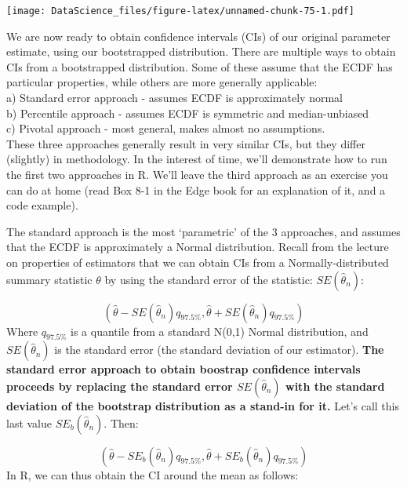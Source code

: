 \documentclass[
]{book}
\begin{document}
\texttt{[image: DataScience\_files/figure-latex/unnamed-chunk-75-1.pdf]}

We are now ready to obtain confidence intervals (CIs) of our original parameter estimate, using our bootstrapped distribution. There are multiple ways to obtain CIs from a bootstrapped distribution. Some of these assume that the ECDF has particular properties, while others are more generally applicable:\\
a) Standard error approach - assumes ECDF is approximately normal\\
b) Percentile approach - assumes ECDF is symmetric and median-unbiased\\
c) Pivotal approach - most general, makes almost no assumptions.\\
These three approaches generally result in very similar CIs, but they differ (slightly) in methodology. In the interest of time, we'll demonstrate how to run the first two approaches in R. We'll leave the third approach as an exercise you can do at home (read Box 8-1 in the Edge book for an explanation of it, and a code example).

The standard approach is the most `parametric' of the 3 approaches, and assumes that the ECDF is approximately a Normal distribution. Recall from the lecture on properties of estimators that we can obtain CIs from a Normally-distributed summary statistic \(\theta\) by using the standard error of the statistic: \(SE(\hat{\theta}_n)\):

\[(\hat{\theta} - SE(\hat{\theta}_n)q_{97.5\%}, \hat{\theta} + SE(\hat{\theta}_n)q_{97.5\%})\]
Where \(q_{97.5\%}\) is a quantile from a standard N(0,1) Normal distribution, and \(SE(\hat{\theta}_n)\) is the standard error (the standard deviation of our estimator). \textbf{The standard error approach to obtain boostrap confidence intervals proceeds by replacing the standard error \(SE(\hat{\theta}_n)\) with the standard deviation of the bootstrap distribution as a stand-in for it.} Let's call this last value \(SE_b(\hat{\theta}_n)\). Then:

\[(\hat{\theta} - SE_b(\hat{\theta}_n)q_{97.5\%}, \hat{\theta} + SE_b(\hat{\theta}_n)q_{97.5\%})\]
In R, we can thus obtain the CI around the mean as follows:
\end{document}
